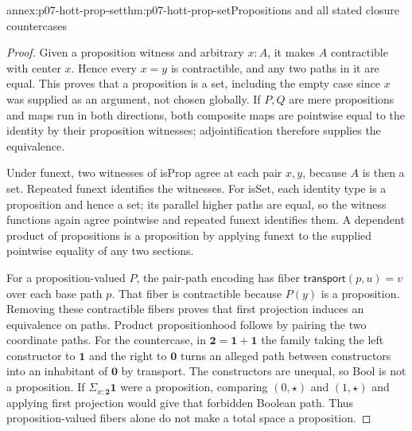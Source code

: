\begin{annexitem}{annex:p07-hott-prop-set}{thm:p07-hott-prop-set}{Propositions and all stated closure countercases}
\begin{proof}
Given a proposition witness and arbitrary $x:A$, it makes $A$
contractible with center $x$. Hence every $x=y$ is contractible,
and any two paths in it are equal. This proves that a proposition
is a set, including the empty case since $x$ was supplied as an
argument, not chosen globally. If $P,Q$ are mere propositions and
maps run in both directions, both composite maps are pointwise
equal to the identity by their proposition witnesses; adjointification
therefore supplies the equivalence.

Under funext, two witnesses of isProp agree at each pair $x,y$,
because $A$ is then a set. Repeated funext identifies the witnesses.
For isSet, each identity type is a proposition and hence a set;
its parallel higher paths are equal, so the witness functions again
agree pointwise and repeated funext identifies them. A dependent
product of propositions is a proposition by applying funext to
the supplied pointwise equality of any two sections.

For a proposition-valued $P$, the pair-path encoding has fiber
$\mathsf{transport}(p,u)=v$ over each base path $p$. That fiber is
contractible because $P(y)$ is a proposition. Removing these
contractible fibers proves that first projection induces an
equivalence on paths. Product propositionhood follows by pairing
the two coordinate paths. For the countercase, in $\mathbf2=\mathbf1+\mathbf1$
the family taking the left constructor to $\mathbf1$ and the right
to $\mathbf0$ turns an alleged path between constructors into an
inhabitant of $\mathbf0$ by transport. The constructors are unequal,
so Bool is not a proposition. If $\Sigma_{x:\mathbf2}\mathbf1$ were
a proposition, comparing $(0,\star)$ and $(1,\star)$ and applying
first projection would give that forbidden Boolean path. Thus
proposition-valued fibers alone do not make a total space a proposition.
\end{proof}
\end{annexitem}

